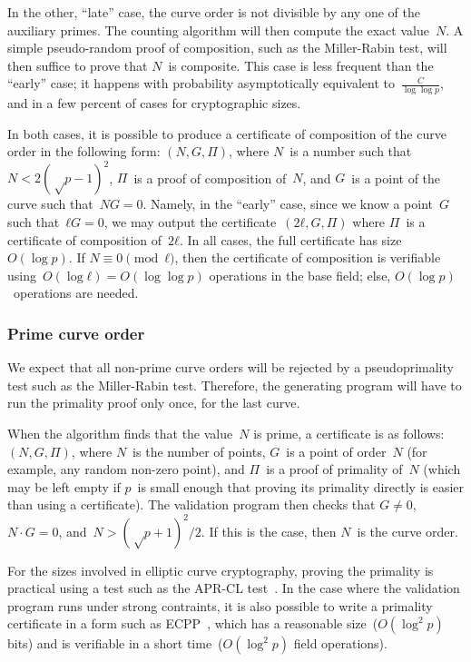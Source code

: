 \documentclass{article}
\begin{document}
\smallskip

In the other, “late” case, the curve order is not divisible
by any one of the auxiliary primes.
The counting algorithm will then compute the exact value~$N$.
A simple pseudo-random proof of composition,
such as the Miller-Rabin test,
will then suffice to prove that $N$~is composite.
This case is less frequent than the “early” case;
it happens with probability
asymptotically equivalent to~$\frac{C}{\log \log p}$,
and in a few percent of cases for cryptographic sizes.

\smallskip

In both cases, it is possible to produce a certificate of composition
of the curve order in the following form: $(N, G, Π)$,
where $N$~is a number such that~$N < 2 (√p - 1)^2$,
$Π$~is a proof of composition of~$N$,
and $G$~is a point of the curve such that~$N G = 0$.
Namely, in the “early” case, since we know a point~$G$ such that~$ℓ G = 0$,
we may output the certificate~$(2 ℓ, G, Π)$
where $Π$~is a certificate of composition of~$2 ℓ$.
In all cases, the full certificate has size~$O(\log p)$.
If $N ≡ 0 \pmod{ℓ}$, then the certificate of composition
is verifiable using~$O(\log ℓ) = O(\log \log p)$ operations in the base field;
else, $O(\log p)$~operations are needed.


\subsubsection{Prime curve order}
We expect that all non-prime curve orders
will be rejected by a pseudoprimality test such as the Miller-Rabin test.
Therefore, the generating program will have to run the primality proof
only once, for the last curve.

When the algorithm finds that the value~$N$ is prime,
a certificate is as follows: $(N, G, Π)$,
where $N$~is the number of points,
$G$~is a point of order~$N$ (for example, any random non-zero point),
and $Π$~is a proof of primality of~$N$
(which may be left empty if $p$~is small enough
that proving its primality directly is easier than using a certificate).
The validation program then checks that $G ≠ 0$,
$N · G = 0$, and~$N > (√p+1)^2 / 2$.
If this is the case, then $N$~is the curve order.

For the sizes involved in elliptic curve cryptography,
proving the primality is practical using a test such as
the APR-CL test~\cite{fcs1980adleman,mathcomp1984cl}.
In the case where the validation program runs under strong contraints,
it is also possible to write a primality certificate
in a form such as ECPP~\cite{mathcomp1993am},
which has a reasonable size~($O(\log^2 p)$ bits)
and is verifiable in a short time~($O(\log^2 p)$ field operations).
\end{document}
